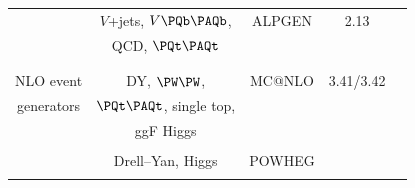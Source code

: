 \begin{table}[t]
\begin{center}
{\begin{tabular}{|c|c|c|c|c|}
                      &    $V$+jets, $V\PQb\PAQb$,            & ALPGEN &     2.13  &  \\  
                      &    QCD, $\PQt\PAQt$          &              &                 &                                      \\  
                     &                          &                       &                      &                       \\   
\hline %
                      &                          &                       &                      &                       \\   
NLO event      &DY, $\PW\PW$,                        & MC@NLO &   3.41/3.42      &                        \\  
generators     & $\PQt\PAQt$, single top,  &                       &                      &                      \\  
                       &    ggF Higgs                    &                      &                      &                       \\  
                       &                                       &                      &                      &                       \\  
                       & Drell--Yan, Higgs                       &  POWHEG      &                      &                       \\  
                      &                                       &                       &                      &                       \\   
\hline %
\end{tabular}
}
\label{tab:nlomctabone}
\end{center}
\end{table}

 
